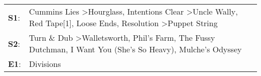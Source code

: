 \begin{supertabular}{p{0.03\textwidth}p{0.92\textwidth}}
 \textbf{S1}:  &  Cummins Lies\textsuperscript{} \textgreater \enspace Hourglass\textsuperscript{}, \enspace Intentions Clear\textsuperscript{} \textgreater \enspace Uncle Wally\textsuperscript{}, \enspace Red Tape[1]\textsuperscript{}, \enspace Loose Ends\textsuperscript{}, \enspace Resolution\textsuperscript{} \textgreater \enspace Puppet String\textsuperscript{}  \enspace  \\
 \textbf{S2}:  &                                                                                 Turn \& Dub\textsuperscript{} \textgreater \enspace Walletsworth\textsuperscript{}, \enspace Phil's Farm\textsuperscript{}, \enspace The Fussy Dutchman\textsuperscript{}, \enspace I Want You (She's So Heavy)\textsuperscript{}, \enspace Mulche's Odyssey\textsuperscript{}  \enspace  \\
 \textbf{E1}:  &                                                                                                                                                                                                                                                                                                                                    Divisions\textsuperscript{}  \enspace  \\
\end{supertabular}
